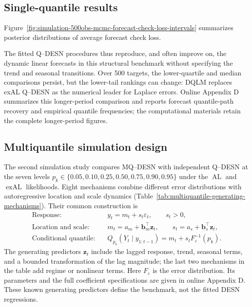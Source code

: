 \documentclass[12pt,letterpaper]{article}
\numberwithin{equation}{section}
\newcommand{\vect}[1]{\bm{#1}}
\newcommand{\AL}{\operatorname{AL}}
\newcommand{\exAL}{\operatorname{exAL}}
\begin{document}
\subsection{Single-quantile results}
\label{subsec:simulation-single-results}

Figure~\ref{fig:simulation-500obs-mcmc-forecast-check-loss-intervals}
summarizes posterior distributions of average forecast check loss.




\clearpage

The fitted Q--DESN procedures thus reproduce, and often improve on, the
dynamic linear forecasts in this structural benchmark without specifying
the trend and seasonal transitions. Over 500 targets, the lower-quartile
and median comparisons persist, but the lower-tail rankings can change:
DQLM replaces exAL Q--DESN as the numerical leader for Laplace errors.
Online Appendix D summarizes this longer-period comparison and reports
forecast quantile-path recovery and empirical quantile frequencies; the
computational materials retain the complete longer-period figures.

\subsection{Multiquantile simulation design}
\label{subsec:simulation-mq-design}

The second simulation study compares MQ--DESN with independent Q--DESN at the
seven levels
\(p_k\in\{0.05,0.10,0.25,0.50,0.75,0.90,0.95\}\)
under the \(\AL\) and \(\exAL\) likelihoods. Eight mechanisms combine
different error distributions with autoregressive location and scale
dynamics (Table~\ref{tab:multiquantile-generating-mechanisms}). Their
common construction is
\begin{equation}
\begin{aligned}
\text{Response:}\quad &y_t=m_t+s_t\varepsilon_t,\qquad s_t>0,\\
\text{Location and scale:}\quad
&m_t=a_m+\vect b_m^\top\vect z_t,\qquad
s_t=a_s+\vect b_s^\top\vect z_t,\\
\text{Conditional quantile:}\quad
&Q_{p_k}(Y_t\mid y_{1:t-1})=m_t+s_t F_\varepsilon^{-1}(p_k).
\end{aligned}
\label{eq:multiquantile-dgp-main}
\end{equation}
The generating predictors \(\vect z_t\) include the lagged response,
trend, seasonal terms, and a bounded transformation of the lag magnitude;
the last two mechanisms in the table add regime or nonlinear terms.
Here \(F_\varepsilon\) is the error distribution. Its parameters and
the full coefficient specifications are given in online Appendix D. These
known generating predictors define the benchmark, not the fitted DESN
regressions.
\end{document}
